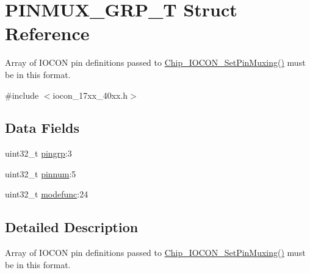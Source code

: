 \hypertarget{structPINMUX__GRP__T}{\section{P\-I\-N\-M\-U\-X\-\_\-\-G\-R\-P\-\_\-\-T Struct Reference}
\label{structPINMUX__GRP__T}
}


Array of I\-O\-C\-O\-N pin definitions passed to \hyperlink{group__IOCON__17XX__40XX_gad97c96e401016cf296e6d20454f1c522}{Chip\-\_\-\-I\-O\-C\-O\-N\-\_\-\-Set\-Pin\-Muxing()} must be in this format.  




{\ttfamily \#include $<$iocon\-\_\-17xx\-\_\-40xx.\-h$>$}

\subsection*{Data Fields}
\begin{DoxyCompactItemize}
\item 
uint32\-\_\-t \hyperlink{structPINMUX__GRP__T_a500436bd5b250eda1bac290e285d9e0d}{pingrp}\-:3
\item 
uint32\-\_\-t \hyperlink{structPINMUX__GRP__T_a7e2e3cb5f08e82cdad3ff8b215d0d448}{pinnum}\-:5
\item 
uint32\-\_\-t \hyperlink{structPINMUX__GRP__T_a32ddff5b2f6776cc4c3d22e14c85d75a}{modefunc}\-:24
\end{DoxyCompactItemize}


\subsection{Detailed Description}
Array of I\-O\-C\-O\-N pin definitions passed to \hyperlink{group__IOCON__17XX__40XX_gad97c96e401016cf296e6d20454f1c522}{Chip\-\_\-\-I\-O\-C\-O\-N\-\_\-\-Set\-Pin\-Muxing()} must be in this format. 

